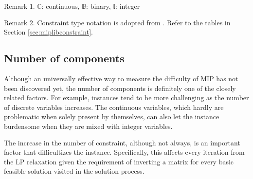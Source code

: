 \begin{table}[H]
\begin{threeparttable}
		\begin{tablenotes}
			\small
			\item Remark 1. $\mathbb{C}$: continuous, $\mathbb{B}$: binary, $\mathbb{I}$: integer
			\item Remark 2. Constraint type notation is adopted from \miplib. Refer to the tables in Section \ref{sec:miplibconstraint}.
		\end{tablenotes}
	\end{threeparttable}
\end{table}

\subsection{Number of components}
Although an universally effective way to measure the difficulty of MIP has not been discovered yet, the number of components is definitely one of the closely related factors. For example, instances tend to be more challenging as the number of discrete variables increases. The continuous variables, which hardly are problematic when solely present by themselves, can also let the instance burdensome when they are mixed with integer variables. 

The increase in the number of constraint, although not always, is an important factor that difficultizes the instance. Specifically, this affects every iteration from the LP relaxation given the requirement of inverting a matrix for every basic feasible solution visited in the solution process. 

